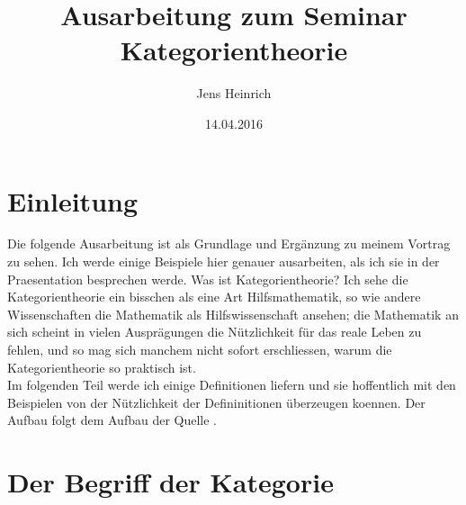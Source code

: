 \documentclass{article}
\title{Ausarbeitung zum Seminar Kategorientheorie}
\author{Jens Heinrich}
\date{14.04.2016}
\begin{document}
\maketitle
\section{Einleitung}
	Die folgende Ausarbeitung ist als Grundlage und Erg\"anzung zu meinem Vortrag zu sehen. 
	Ich werde einige Beispiele hier genauer ausarbeiten, als ich sie in der Praesentation besprechen werde.
	Was ist Kategorientheorie? 
	Ich sehe die Kategorientheorie ein bisschen als eine Art Hilfsmathematik, so wie andere Wissenschaften die Mathematik als Hilfswissenschaft ansehen;
	die Mathematik an sich scheint in vielen Auspr\"agungen die N\"utzlichkeit f\"ur das reale Leben zu fehlen,
	und so mag sich manchem nicht sofort erschliessen, 
	warum die Kategorientheorie so praktisch ist.
	\\
	Im folgenden Teil werde ich einige Definitionen liefern und sie hoffentlich mit den Beispielen von der N\"utzlichkeit der Defininitionen \"uberzeugen koennen. Der Aufbau folgt dem Aufbau der Quelle \nocite{Bra}.
	
\section{Der Begriff der Kategorie}
	
\end{document}
